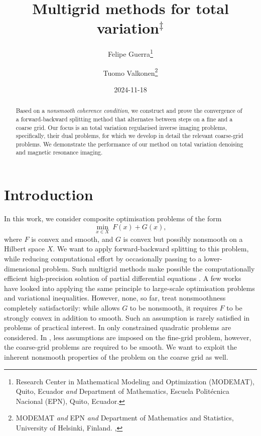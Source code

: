 \documentclass[a4paper,english]{jnsao}
\title{Multigrid methods for total variation\texorpdfstring{$^\ddagger$}{}}
\date{2024-11-18}
\author{%
    Felipe Guerra\thanks{Research Center in Mathematical Modeling and Optimization (MODEMAT), Quito, Ecuador \emph{and} Department of Mathematics, Escuela Politécnica Nacional (EPN), Quito, Ecuador. \email{edison.guerra@epn.edu.ec}}
    \and
    Tuomo Valkonen\thanks{MODEMAT \emph{and} EPN \emph{and} Department of Mathematics and Statistics, University of Helsinki, Finland. \email{tuomo.valkonen@iki.fi}, \orcid{0000-0001-6683-3572}}
}
\theoremstyle{definition}
\numberwithin{algorithm}{section}
\begin{document}
\maketitle

\begin{abstract}
    Based on a \emph{nonsmooth coherence condition}, we construct and prove the convergence of a forward-backward splitting method that alternates between steps on a fine and a coarse grid.
    Our focus is an total variation regularised inverse imaging problems, specifically, their dual problems, for which we develop in detail the relevant coarse-grid problems.
    We demonstrate the performance of our method on total variation denoising and magnetic resonance imaging.
\end{abstract}

\section{Introduction}

In this work, we consider composite optimisation problems of the form
\begin{equation}
    \label{eq:intro:problem:fine-grid}
    \min_{x \in X}~ F(x) + G(x),
\end{equation}
where $F$ is convex and smooth, and $G$ is convex but possibly nonsmooth on a Hilbert space $X$.
We want to apply forward-backward splitting \cite{lions1979splitting}
to this problem, while reducing computational effort by occasionally passing to a lower-dimensional problem.
Such multigrid methods make possible the computationally efficient high-precision solution of partial differential equations \cite{briggs2000multigrid}.
A few works \cite{nash2000multigrid,parpas2017multilevel,kornhuber1994monotone,ang2024mgprox} have looked into applying the same principle to large-scale optimisation problems and variational inequalities.
However, none, so far, treat nonsmoothness completely satisfactorily: while \cite{ang2024mgprox} allows $G$ to be nonsmooth, it requires $F$ to be strongly convex in addition to smooth.
Such an assumption is rarely satisfied in problems of practical interest.
In \cite{kornhuber1994monotone} only constrained quadratic problems are considered.
In \cite{parpas2017multilevel}, less assumptions are imposed on the fine-grid problem, however, the coarse-grid problems are required to be smooth.
We want to exploit the inherent nonsmooth properties of the problem on the coarse grid as well.
\end{document}
